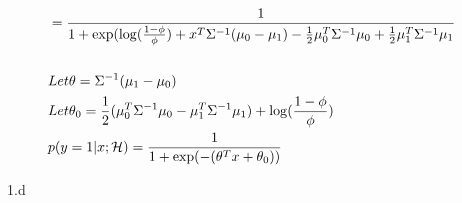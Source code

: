 \begin{answer}
\begin{align*}
    &\\ 
    &= \frac { 1 }
      { 1 + \exp( \log(\frac{1-\phi}{\phi}) + x^T \Sigma^{-1} (\mu_0 -  \mu_1) -\frac{1}{2} \mu_0^T \Sigma^{-1} \mu_0  + \frac{1}{2} \mu_1^T \Sigma^{-1} \mu_1}\\
    &\\ 
    & Let \theta = \Sigma^{-1} (\mu_1 -  \mu_0) &\\ 
    & Let \theta_0 =  \frac{1}{2}(\mu_0^T \Sigma^{-1}  \mu_0  - \mu_1^T  \Sigma^{-1} \mu_1) + \log(\frac{1-\phi}{\phi})&\\ 
    & p(y =1\vert  x ; \mathcal{H}) = \frac { 1 }    { 1 + \exp(-(\theta^Tx + \theta_0))}
    &\\ 
  \end{align*}
\end{answer}
\clearpage

\LARGE
1.d
\normalsize

